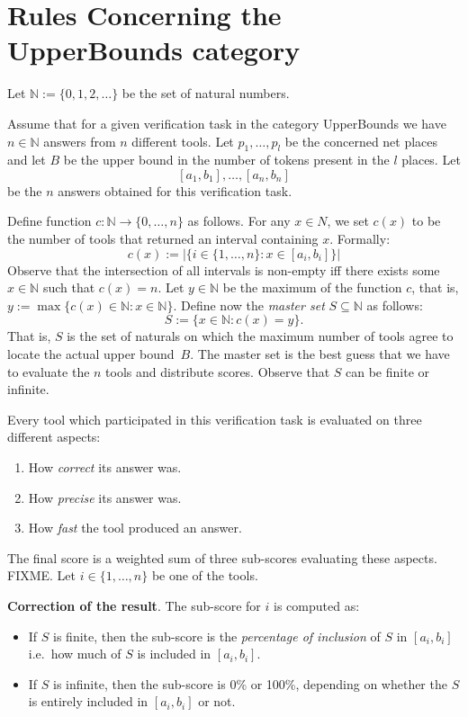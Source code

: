 \documentclass[10pt,english,a4paper]{article}
\newcommand\eqdef            {\mathrel{:=}}
\newcommand\set[1]           {{\{ #1 \mathclose \}}}
\newcommand\N                {\mathbb{N}}
\begin{document}
\section{Rules Concerning the UpperBounds category}


Let $\N \eqdef \set{0, 1, 2, \ldots}$ be the set of natural numbers.

Assume that for a given verification task in the category
UpperBounds we have $n \in \N$ answers from $n$ different tools.
Let $p_1, \ldots, p_l$ be the concerned net places and let $B$ be the upper
bound in the number of tokens present in the $l$ places.
Let
\[
[a_1, b_1], \ldots, [a_n, b_n]
\]
be the $n$ answers obtained for this verification task.

Define function $c \colon \N \to \set{0, \ldots, n}$ as follows.
For any $x \in N$, we set $c(x)$ to be the number of tools that returned an
interval containing $x$. Formally:
\[
c(x) \eqdef |\set{i \in \set{1, \ldots, n} \colon x \in [a_i,b_i]}|
\]
Observe that the intersection of all intervals is non-empty iff
there exists some $x \in \N$ such that $c(x) = n$.
Let $y \in \N$ be the maximum of the function $c$, that is,
$y \eqdef \max\set{c(x) \in \N \colon x \in \N}$.
Define now the \emph{master set} $S \subseteq \N$ as follows:
\[
S \eqdef \set{x \in \N \colon c(x) = y}.
\]
That is, $S$ is the set of naturals on which the maximum number of tools agree
to locate the actual upper bound~$B$.
The master set is the best guess that we have to evaluate the $n$ tools and
distribute scores. Observe that $S$ can be finite or infinite.

Every tool which participated in this verification task is evaluated on three
different aspects:
\begin{enumerate}
\item
  How \emph{correct} its answer was.
\item
  How \emph{precise} its answer was.
\item
  How \emph{fast} the tool produced an answer.
\end{enumerate}
The final score is a weighted sum of three sub-scores evaluating these aspects.
FIXME.
Let $i \in \set{1, \ldots, n}$ be one of the tools. 

\textbf{Correction of the result}. The sub-score for $i$ is computed as:
\begin{itemize}
\item
  If $S$ is finite, then the sub-score is the
  \textit{percentage of inclusion} of $S$ in $[a_i, b_i]$
  i.e.\ how much of $S$ is included in $[a_i,b_i]$.
\item
  If $S$ is infinite, then the sub-score is 0\% or 100\%, depending on whether
  the $S$ is entirely included in $[a_i,b_i]$ or not.
\end{itemize}
\end{document}
